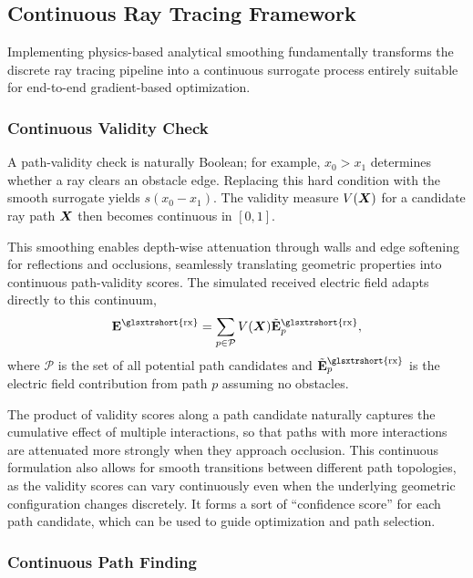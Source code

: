 \subsection{Continuous Ray Tracing Framework}

Implementing physics-based analytical smoothing fundamentally transforms the discrete ray tracing pipeline into a continuous surrogate process entirely suitable for end-to-end gradient-based optimization.

\subsubsection{Continuous Validity Check}

A path-validity check is naturally Boolean; for example, $x_0>x_1$ determines whether a ray clears an obstacle edge. Replacing this hard condition with the smooth surrogate yields $s(x_0-x_1)$. The validity measure $V(\boldsymbol{X})$ for a candidate ray path $\boldsymbol{X}$ then becomes continuous in $[0, 1]$.

This smoothing enables depth-wise attenuation through walls and edge softening for reflections and occlusions, seamlessly translating geometric properties into continuous path-validity scores. The simulated received electric field adapts directly to this continuum,
\begin{equation}\label{eq:field_approx}
\bsup{E}^\text{\glsxtrshort{rx}} = \sum\limits_{p \in \mathcal{P}} V(\bsit{X}) \tilde{\bsup{E}}_p^\text{\glsxtrshort{rx}},
\end{equation}
where $\mathcal{P}$ is the set of all potential path candidates and $\tilde{\bsup{E}}_p^\text{\glsxtrshort{rx}}$ is the electric field contribution from path $p$ assuming no obstacles.

The product of validity scores along a path candidate naturally captures the cumulative effect of multiple interactions, so that paths with more interactions are attenuated more strongly when they approach occlusion. This continuous formulation also allows for smooth transitions between different path topologies, as the validity scores can vary continuously even when the underlying geometric configuration changes discretely. It forms a sort of \enquote{confidence score} for each path candidate, which can be used to guide optimization and path selection.

\subsubsection{Continuous Path Finding}


